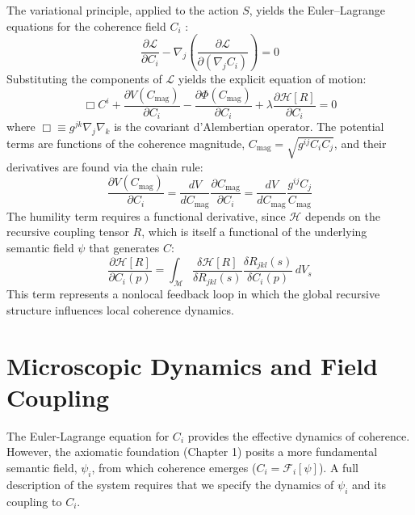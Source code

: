 The variational principle, applied to the action \(S\), yields the Euler–Lagrange equations for the coherence field \(C_i\) \autocite{Euler1744, Lagrange1788}:
\begin{equation}
\frac{\partial \mathcal{L}}{\partial C_i} - \nabla_j \left( \frac{\partial \mathcal{L}}{\partial (\nabla_j C_i)} \right) = 0
\end{equation}
Substituting the components of \(\mathcal{L}\) yields the explicit equation of motion:
\begin{equation}
\Box C^i + \frac{\partial V(C_{\mathrm{mag}})}{\partial C_i} - \frac{\partial \Phi(C_{\mathrm{mag}})}{\partial C_i} + \lambda \frac{\partial \mathcal{H}[R]}{\partial C_i} = 0
\end{equation}
where \(\Box \equiv g^{jk}\nabla_j \nabla_k\) is the covariant d'Alembertian operator. The potential terms are functions of the coherence magnitude, \(C_{\text{mag}} = \sqrt{g^{ij} C_i C_j}\), and their derivatives are found via the chain rule:
\begin{equation}
\frac{\partial V(C_{\mathrm{mag}})}{\partial C_i} = \frac{dV}{dC_{\mathrm{mag}}} \frac{\partial C_{\mathrm{mag}}}{\partial C_i} = \frac{dV}{dC_{\mathrm{mag}}} \frac{g^{ij} C_j}{C_{\mathrm{mag}}}
\end{equation}
The humility term requires a functional derivative, since \(\mathcal{H}\) depends on the recursive coupling tensor \(R\), which is itself a functional of the underlying semantic field \(\psi\) that generates \(C\):
\begin{equation}
\frac{\partial \mathcal{H}[R]}{\partial C_i(p)} = \int_{\mathcal{M}} \frac{\delta \mathcal{H}[R]}{\delta R_{jkl}(s)} \frac{\delta R_{jkl}(s)}{\delta C_i(p)} \, dV_s
\end{equation}
This term represents a nonlocal feedback loop in which the global recursive structure influences local coherence dynamics.

\section{Microscopic Dynamics and Field Coupling}

The Euler-Lagrange equation for \(C_i\) provides the effective dynamics of coherence. However, the axiomatic foundation (Chapter 1) posits a more fundamental semantic field, \(\psi_i\), from which coherence emerges (\(C_i = \mathcal{F}_i[\psi]\)). A full description of the system requires that we specify the dynamics of \(\psi_i\) and its coupling to \(C_i\).

